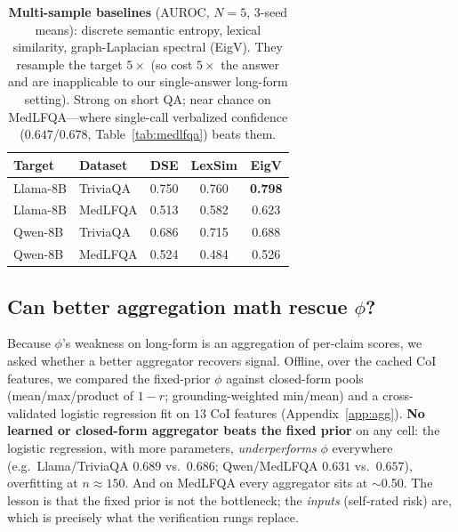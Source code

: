\documentclass[11pt]{article}
\begin{document}
\begin{table}[t]
\centering\small
\begin{tabular}{llccc}
\toprule
Target & Dataset & DSE & LexSim & EigV \\
\midrule
Llama-8B & TriviaQA & 0.750 & 0.760 & \textbf{0.798} \\
Llama-8B & MedLFQA  & 0.513 & 0.582 & 0.623 \\
Qwen-8B  & TriviaQA & 0.686 & 0.715 & 0.688 \\
Qwen-8B  & MedLFQA  & 0.524 & 0.484 & 0.526 \\
\bottomrule
\end{tabular}
\caption{\textbf{Multi-sample baselines} (AUROC, $N{=}5$, 3-seed means): discrete semantic
entropy, lexical similarity, graph-Laplacian spectral (EigV). They resample the target
$5\times$ (so cost $5\times$ the answer and are inapplicable to our single-answer long-form
setting). Strong on short QA; near chance on MedLFQA---where single-call verbalized confidence
($0.647$/$0.678$, Table~\ref{tab:medlfqa}) beats them.}
\label{tab:baselines}
\end{table}

\subsection{Can better aggregation math rescue $\phi$?}
Because $\phi$'s weakness on long-form is an aggregation of per-claim scores, we asked
whether a better aggregator recovers signal. Offline, over the cached CoI features, we
compared the fixed-prior $\phi$ against closed-form pools (mean/max/product of
$1{-}r$; grounding-weighted min/mean) and a cross-validated logistic regression fit on
$13$ CoI features (Appendix~\ref{app:agg}). \textbf{No learned or closed-form aggregator
beats the fixed prior} on any cell: the logistic regression, with more parameters,
\emph{underperforms} $\phi$ everywhere (e.g.\ Llama/TriviaQA $0.689$ vs.\ $0.686$;
Qwen/MedLFQA $0.631$ vs.\ $0.657$), overfitting at $n{\approx}150$. And on MedLFQA every
aggregator sits at $\sim$0.50. The lesson is that the fixed prior is not the bottleneck;
the \emph{inputs} (self-rated risk) are, which is precisely what the verification rungs
replace.
\end{document}
